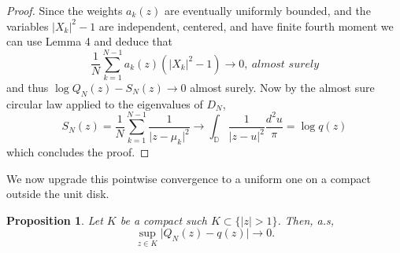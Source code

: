 \documentclass[12pt,a4paper]{amsart}
\theoremstyle{plain} %
\newtheorem{proposition}[theorem]{Proposition}
\newcommand{\DD}{\mathbb{D}}
\begin{document}
\begin{proof}
    Since the weights $a_k(z)$ are eventually uniformly bounded, and the variables $\lvert X_k \lvert ^2-1$ are independent, centered, and have finite fourth moment we can use Lemma 4 and deduce that
    \begin{equation*}
        \frac{1}{N}\sum_{k=1}^{N-1}a_k(z)(\lvert X_k \lvert^2-1) \rightarrow0, \ \textit{almost surely}
    \end{equation*}
    and thus $\log Q_N(z) -S_N(z)\rightarrow 0$ almost surely. Now by the almost sure circular law applied to the eigenvalues of $D_N$, 
    \begin{equation*}
        S_N(z)=\frac{1}{N}\sum_{k=1}^{N-1}\frac{1}{\lvert z-\mu_k \lvert^2}\rightarrow\int_{\DD}\frac{1}{\lvert z-u\lvert^2}\frac{d^2u}{\pi}=\log q(z)
    \end{equation*}
    which concludes the proof.
\end{proof}
We now upgrade this pointwise convergence to a uniform one on a compact outside the unit disk.
\begin{proposition}
     Let $K$ be a compact such $K \subset \{\lvert z \lvert >1\}$. Then, a.s,
     \begin{equation*}
         \sup_{z\in K}\lvert Q_N(z)-q(z)\lvert \rightarrow0.
     \end{equation*}
 \end{proposition}
\end{document}
